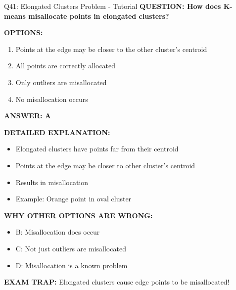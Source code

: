 \documentclass[8pt]{beamer}
\begin{document}
	\begin{frame}{Q41: Elongated Clusters Problem - Tutorial}
		\fontsize{6.5}{7.5}\selectfont
		\textbf{QUESTION: How does K-means misallocate points in elongated clusters?}
		
		\vspace{0.1cm}
		\textbf{OPTIONS:}
		\begin{enumerate}
			\item Points at the edge may be closer to the other cluster's centroid
			\item All points are correctly allocated
			\item Only outliers are misallocated
			\item No misallocation occurs
		\end{enumerate}
		
		\vspace{0.1cm}
		\textcolor{myblue}{\textbf{ANSWER: A}}
		
		\vspace{0.1cm}
		\textbf{DETAILED EXPLANATION:}
		\begin{itemize}
			\item Elongated clusters have points far from their centroid
			\item Points at the edge may be closer to other cluster's centroid
			\item Results in misallocation
			\item Example: Orange point in oval cluster
		\end{itemize}
		
		\vspace{0.1cm}
		\textcolor{myred}{\textbf{WHY OTHER OPTIONS ARE WRONG:}}
		\begin{itemize}
			\item \textcolor{myred}{B:} Misallocation does occur
			\item \textcolor{myred}{C:} Not just outliers are misallocated
			\item \textcolor{myred}{D:} Misallocation is a known problem
		\end{itemize}
		
		\textcolor{myred}{\textbf{EXAM TRAP:}} Elongated clusters cause \textcolor{myblue}{edge points to be misallocated}!
	\end{frame}
	
\end{document}
